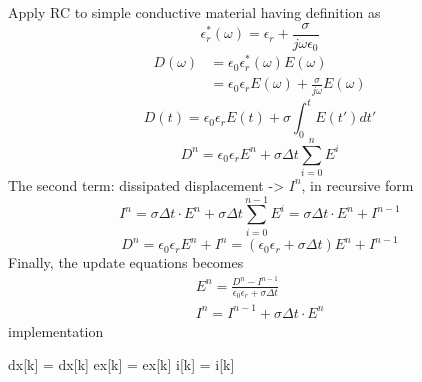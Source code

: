 Apply RC to simple conductive material having definition as
\begin{displaymath}
  \epsilon_r^{*}(\omega) = \epsilon_r + \frac{\sigma}{j \omega \epsilon_0}
\end{displaymath}
\begin{displaymath}
  \begin{split}
    D(\omega) & = \epsilon_0 \epsilon_r^{*}(\omega) E(\omega)\\
    & = \epsilon_0 \epsilon_r E(\omega) + \frac{\sigma}{j\omega}E(\omega)
  \end{split}
\end{displaymath}
\begin{displaymath}
  D(t) = \epsilon_0 \epsilon_rE(t) + \sigma \int_0^t E(t')dt'
\end{displaymath}
\begin{displaymath}
    D^n = \epsilon_0 \epsilon_r E^n + \sigma \Delta t \sum_{i=0}^{n}E^i
\end{displaymath}
The second term: dissipated displacement -> $I^n$, in recursive form
\begin{equation}
  I^n = \sigma\Delta t\cdot E^n + \sigma\Delta t\sum_{i=0}^{n-1}E^i = \sigma\Delta t\cdot E^n + I^{n-1}
\end{equation}
\begin{equation}
    D^n = \epsilon_0 \epsilon_r E^n + I^n = (\epsilon_0 \epsilon_r + \sigma \Delta t) E^n + I^{n-1}
\end{equation}
Finally, the update equations becomes
\begin{gather*}
  E^n = \frac{D^n - I^{n-1}}{\epsilon_0 \epsilon_r + \sigma \Delta t}\\
  I^n = I^{n-1} + \sigma \Delta t\cdot E^n
\end{gather*}
implementation
\begin{code}
  dx[k] = dx[k]
  ex[k] = ex[k]
  i[k]  = i[k]
\end{code}


